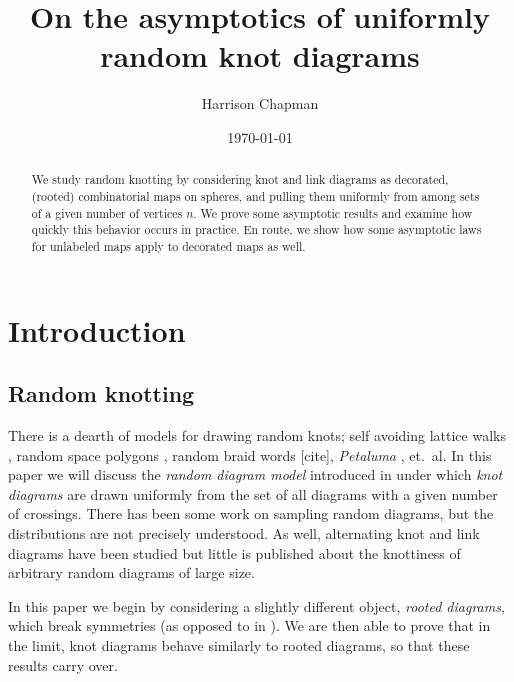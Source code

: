 \documentclass[amsmath,longbibliography,secnumarabic,floatfix,amssymb,nofootinbib,nobibnotes,letterpaper,11pt,tightenlines,notitlepage,showkeys,showlabels]{amsart}%
\theoremstyle{definition}
\begin{document}
\title[]{On the asymptotics of uniformly random knot diagrams} \author{Harrison Chapman}
\address{Department of Mathematics\\
University of Georgia, Athens GA}
\date{\today}


\begin{abstract}
  We study random knotting by considering knot and link diagrams as
  decorated, (rooted) combinatorial maps on spheres, and pulling them
  uniformly from among sets of a given number of vertices $n$. We
  prove some asymptotic results and examine how quickly this behavior
  occurs in practice. En route, we show how some asymptotic laws for
  unlabeled maps apply to decorated maps as well.
\end{abstract}
\maketitle

\doublespacing
\section{Introduction}
\label{sec:intro}

\subsection{Random knotting}
\label{sec:random-knotting}

There is a dearth of models for drawing random knots; self avoiding
lattice walks \cite{Sumners_1988}, random space polygons
\cite{Cantarella_2015,Cantarella_2013}, random braid words [cite],
\emph{Petaluma} \cite{petaluma1}, et.\ al. In this paper we will
discuss the \emph{random diagram model} introduced in
\cite{CCMknotdiagrams2015} under which \emph{knot diagrams} are drawn
uniformly from the set of all diagrams with a given number of
crossings. There has been some work on sampling random
diagrams\cite{diaoernst2012pnmkt}, but the distributions
are not precisely understood.  As well, alternating knot and link
diagrams have been studied \cite{PZJasympconj2004} but little is
published about the knottiness of arbitrary random diagrams of large
size.

In this paper we begin by considering a slightly different object,
\emph{rooted diagrams}, which break symmetries (as opposed to in
). We are then able to prove that in the
limit, knot diagrams behave similarly to rooted diagrams, so that
these results carry over.
\end{document}
